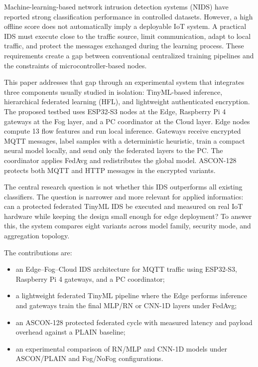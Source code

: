 \documentclass[runningheads]{llncs}
\begin{document}
Machine-learning-based network intrusion detection systems (NIDS) have reported strong classification performance in controlled datasets. However, a high offline score does not automatically imply a deployable IoT system. A practical IDS must execute close to the traffic source, limit communication, adapt to local traffic, and protect the messages exchanged during the learning process. These requirements create a gap between conventional centralized training pipelines and the constraints of microcontroller-based nodes.

This paper addresses that gap through an experimental system that integrates three components usually studied in isolation: TinyML-based inference, hierarchical federated learning (HFL), and lightweight authenticated encryption. The proposed testbed uses ESP32-S3 nodes at the Edge, Raspberry Pi 4 gateways at the Fog layer, and a PC coordinator at the Cloud layer. Edge nodes compute 13 flow features and run local inference. Gateways receive encrypted MQTT messages, label samples with a deterministic heuristic, train a compact neural model locally, and send only the federated layers to the PC. The coordinator applies FedAvg and redistributes the global model. ASCON-128 protects both MQTT and HTTP messages in the encrypted variants.

The central research question is not whether this IDS outperforms all existing classifiers. The question is narrower and more relevant for applied informatics: can a protected federated TinyML IDS be executed and measured on real IoT hardware while keeping the design small enough for edge deployment? To answer this, the system compares eight variants across model family, security mode, and aggregation topology.

The contributions are:
\begin{itemize}
    \item an Edge--Fog--Cloud IDS architecture for MQTT traffic using ESP32-S3, Raspberry Pi 4 gateways, and a PC coordinator;
    \item a lightweight federated TinyML pipeline where the Edge performs inference and gateways train the final MLP/RN or CNN-1D layers under FedAvg;
    \item an ASCON-128 protected federated cycle with measured latency and payload overhead against a PLAIN baseline;
    \item an experimental comparison of RN/MLP and CNN-1D models under ASCON/PLAIN and Fog/NoFog configurations.
\end{itemize}
\end{document}
